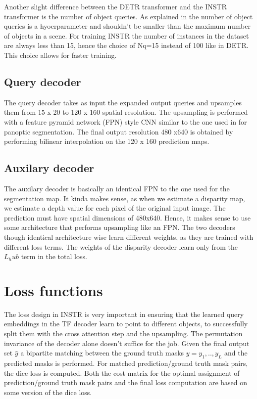 Another slight difference between the DETR transformer and the INSTR transformer is the number of object queries. As explained in \cite{DETR} the number of object queries is a hyoerparameter and shouldn't be smaller than the maximum number of objects in a scene. For training INSTR the number of instances in the dataset are always less than 15, hence the choice of Nq=15 instead of 100 like in DETR. This choice allows for faster training.\par

\subsection{Query decoder}
The query decoder takes as input the expanded output queries and upsamples them from 15 x 20 to 120 x 160 spatial resolution. The upsampling is performed with a feature pyramid network (FPN)\cite{fpn} style CNN similar to the one used in \cite{DETR} for panoptic segmentation. The final output resolution 480 x640 is obtained by performing bilinear interpolation on the 120 x 160 prediction maps.\par

\subsection{Auxilary decoder}
The auxilary decoder is basically an identical FPN to the one used for the segmentation map. It kinda makes sense, as when we estimate a disparity map, we estimate a depth value for each pixel of the original input image. The prediction must have spatial dimensions of 480x640. Hence, it makes sense to use some architecture that performs upsampling like an FPN. The two decoders though identical architecture wise learn different weights, as they are trained with different loss terms. The weights of the disparity decoder learn only from the $L_hub$ term in the total loss.
\section{Loss functions}
The loss design in INSTR is very important in ensuring that the learned query embeddings in the TF decoder learn to point to different objects, to successfully split them with the cross attention step and the upsampling. The permutation invariance of the decoder alone doesn't suffice for the job.
Given the final output set $\hat{y}$ a bipartite matching between the ground truth masks $y = {y_1, ..,y_L}$ and the predicted masks is performed. For matched prediction/ground truth mask pairs, the dice loss is computed. Both the cost matrix for the optimal assignment of prediction/ground truth mask pairs and the final loss computation are based on some version of the dice loss.\par
